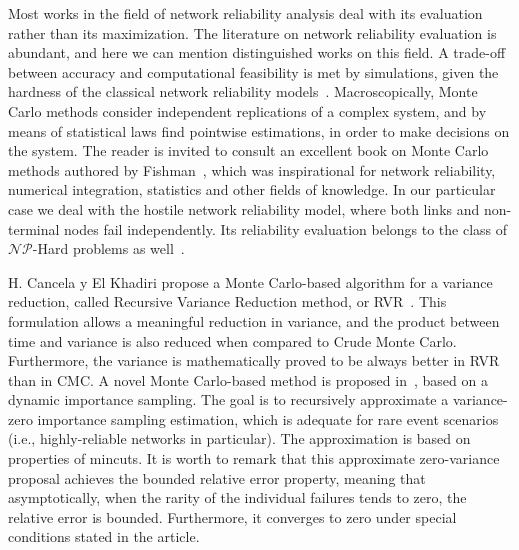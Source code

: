 Most works in the field of network reliability analysis deal with its evaluation rather than its maximization. The literature on network reliability evaluation is abundant, and here we can mention distinguished works on this field. A trade-off between accuracy and computational feasibility is met by simulations, 
given the hardness of the classical network reliability models~\cite{111}. Macroscopically, Monte Carlo methods 
consider independent replications of a complex system, and by means of statistical laws find pointwise 
estimations, in order to make decisions on the system. The reader is invited to consult an excellent book on 
Monte Carlo methods authored by Fishman~\cite{105}, which was inspirational for network reliability, numerical integration, statistics and other fields of knowledge. In our particular case we deal with the 
hostile network reliability model, where both links and non-terminal nodes fail independently. Its reliability evaluation belongs to the class of $\mathcal{NP}$-Hard problems as well~\cite{107}.

H. Cancela y El Khadiri propose a Monte Carlo-based algorithm for a variance reduction, 
called Recursive Variance Reduction method, or RVR~\cite{80}. This formulation allows a meaningful reduction in variance, and the product between time and variance is also reduced when compared to Crude Monte Carlo. Furthermore, the variance is mathematically proved to be always better in RVR than in CMC. A novel Monte Carlo-based method is proposed in~\cite{79}, based on a dynamic importance sampling. 
The goal is to recursively approximate a variance-zero importance sampling estimation, which is adequate 
for rare event scenarios (i.e., highly-reliable networks in particular). The approximation is based on 
properties of mincuts. It is worth to remark that this approximate zero-variance proposal achieves the 
bounded relative error property, meaning that asymptotically, when the rarity of the individual failures 
tends to zero, the relative error is bounded. Furthermore, it converges to zero under special conditions stated in the article. 

